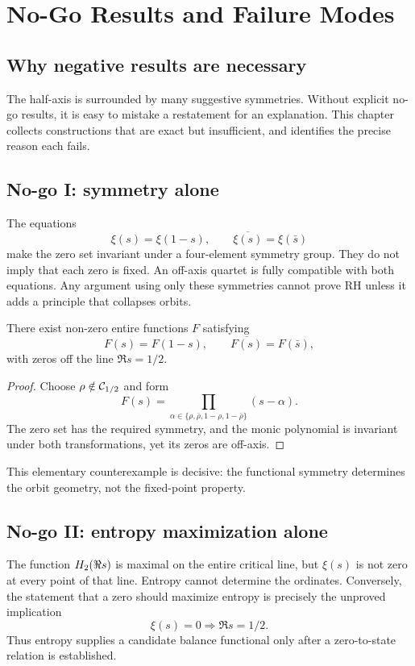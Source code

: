 \chapter{No-Go Results and Failure Modes}
\label{chap:nogo}

\section{Why negative results are necessary}

The half-axis is surrounded by many suggestive symmetries. Without explicit no-go results, it is easy to mistake a restatement for an explanation. This chapter collects constructions that are exact but insufficient, and identifies the precise reason each fails.

\section{No-go I: symmetry alone}

The equations
\[
 \xi(s)=\xi(1-s),\qquad \overline{\xi(s)}=\xi(\bar s)
\]
make the zero set invariant under a four-element symmetry group. They do not imply that each zero is fixed. An off-axis quartet is fully compatible with both equations. Any argument using only these symmetries cannot prove RH unless it adds a principle that collapses orbits.

\begin{proposition}
There exist non-zero entire functions $F$ satisfying
\[
 F(s)=F(1-s),\qquad \overline{F(s)}=F(\bar s),
\]
with zeros off the line $\Re s=1/2$.
\end{proposition}
\begin{proof}
Choose $\rho\notin\mathcal{C}_{1/2}$ and form
\[
 F(s)=\prod_{\alpha\in\{\rho,\bar\rho,1-\rho,1-\bar\rho\}}(s-\alpha).
\]
The zero set has the required symmetry, and the monic polynomial is invariant under both transformations, yet its zeros are off-axis.
\end{proof}

This elementary counterexample is decisive: the functional symmetry determines the orbit geometry, not the fixed-point property.

\section{No-go II: entropy maximization alone}

The function $H_2(\Re s)$ is maximal on the entire critical line, but $\xi(s)$ is not zero at every point of that line. Entropy cannot determine the ordinates. Conversely, the statement that a zero should maximize entropy is precisely the unproved implication
\[
 \xi(s)=0\Longrightarrow\Re s=1/2.
\]
Thus entropy supplies a candidate balance functional only after a zero-to-state relation is established.

